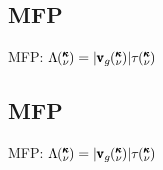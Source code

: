 \documentclass{beamer}
\newcommand{\kv}{\mspace{-4.0mu}\left(\mspace{-8.0mu}
\begin{smallmatrix}&\pmb{\kappa} \\&\nu\end{smallmatrix}
\mspace{-3.0mu}\right)}
\begin{document}
\subsection{MFP}
\begin{frame}{MFP: $\Lambda \kv=|{\pmb{\mathrm{v}}_{g}\kv}|{\tau\kv}$}
\begin{figure}[t]
\begin{center}
\vspace*{-0.6cm}
\renewcommand{\figure}{Fig.}
\label{fig:mfp_contribution}
\end{center}
\end{figure}
\end{frame}

\subsection{MFP}
\begin{frame}{MFP: $\Lambda \kv=|{\pmb{\mathrm{v}}_{g}\kv}|{\tau\kv}$}
\begin{figure}[t]
\begin{center}
\vspace*{-0.6cm}
\renewcommand{\figure}{Fig.}
\label{fig:mfp_contribution}
\end{center}
\end{figure}
\end{frame}

\end{document}
